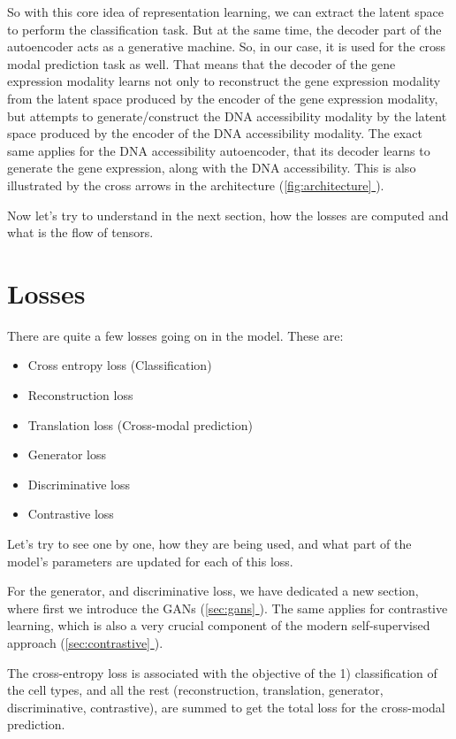 \documentclass[12pt, a4paper]{article}
\newcommand*{\fullref}[1]{\hyperref[{#1}]{\ref*{#1} \nameref*{#1}}}
\begin{document}
So with this core idea of representation learning, we can extract the latent space to perform the classification task. But at the same time, the decoder part of the autoencoder acts as a generative machine. So, in our case, it is used for the cross modal prediction task as well. That means that the decoder of the gene expression modality learns not only to reconstruct the gene expression modality from the latent space produced by the encoder of the gene expression modality, but attempts to generate/construct the DNA accessibility modality by the latent space produced by the encoder of the DNA accessibility modality. The exact same applies for the DNA accessibility autoencoder, that its decoder learns to generate the gene expression, along with the DNA accessibility. This is also illustrated by the cross arrows in the architecture (\fullref{fig:architecture}).

Now let's try to understand in the next section, how the losses are computed and what is the flow of tensors.

\clearpage

\section{Losses}
\label{sec:losses}

There are quite a few losses going on in the model. These are: 


\begin{itemize}
  \itemsep -0.1em
  \item Cross entropy loss (Classification)  
  \item Reconstruction loss
  \item Translation loss (Cross-modal prediction)
  \item Generator loss
  \item Discriminative loss
  \item Contrastive loss
\end{itemize}

Let's try to see one by one, how they are being used, and what part of the model's parameters are updated for each of this loss.

For the generator, and discriminative loss, we have dedicated a new section, where first we introduce the GANs (\fullref{sec:gans}). The same applies for contrastive learning, which is also a very crucial component of the modern self-supervised approach (\fullref{sec:contrastive}).

The cross-entropy loss is associated with the objective of the 1) classification of the cell types, and all the rest (reconstruction, translation, generator, discriminative, contrastive), are summed to get the total loss for the cross-modal prediction.
\end{document}
